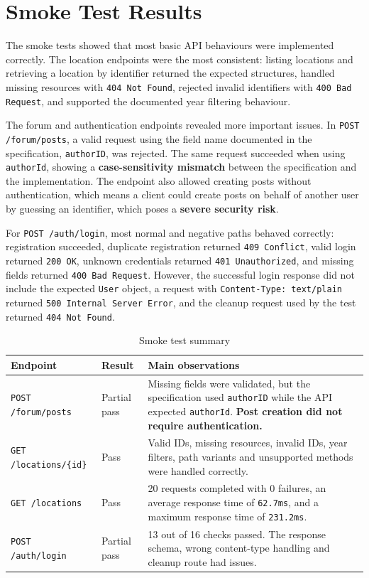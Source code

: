\newpage 

\section{Smoke Test Results}

The smoke tests showed that most basic API behaviours were implemented correctly. The location endpoints were the most consistent: listing locations and retrieving a location by identifier returned the expected structures, handled missing resources with \texttt{404 Not Found}, rejected invalid identifiers with \texttt{400 Bad Request}, and supported the documented year filtering behaviour.

The forum and authentication endpoints revealed more important issues. In \texttt{POST /forum/posts}, a valid request using the field name documented in the specification, \texttt{authorID}, was rejected. The same request succeeded when using \texttt{authorId}, showing a \textbf{case-sensitivity mismatch} between the specification and the implementation. The endpoint also allowed creating posts without authentication, which means a client could create posts on behalf of another user by guessing an identifier, which poses a \textbf{severe security risk}.

For \texttt{POST /auth/login}, most normal and negative paths behaved correctly: registration succeeded, duplicate registration returned \texttt{409 Conflict}, valid login returned \texttt{200 OK}, unknown credentials returned \texttt{401 Unauthorized}, and missing fields returned \texttt{400 Bad Request}. However, the successful login response did not include the expected \texttt{User} object, a request with \texttt{Content-Type: text/plain} returned \texttt{500 Internal Server Error}, and the cleanup request used by the test returned \texttt{404 Not Found}.

\begin{table}[H]
    \centering
    \caption{Smoke test summary}
    \label{tab:g16_smoke_summary}
    \begin{tabular}{p{} p{} p{}}
    \hline
    \textbf{Endpoint} & \textbf{Result} & \textbf{Main observations} \\\hline
    \texttt{POST /forum/posts} & Partial pass & Missing fields were validated, but the specification used \texttt{authorID} while the API expected \texttt{authorId}. \textbf{Post creation did not require authentication.} \\
    \texttt{GET /locations/\{id\}} & Pass & Valid IDs, missing resources, invalid IDs, year filters, path variants and unsupported methods were handled correctly. \\
    \texttt{GET /locations} & Pass & 20 requests completed with 0 failures, an average response time of \texttt{62.7ms}, and a maximum response time of \texttt{231.2ms}. \\
    \texttt{POST /auth/login} & Partial pass & 13 out of 16 checks passed. The response schema, wrong content-type handling and cleanup route had issues. \\\hline
    \end{tabular}
\end{table}

